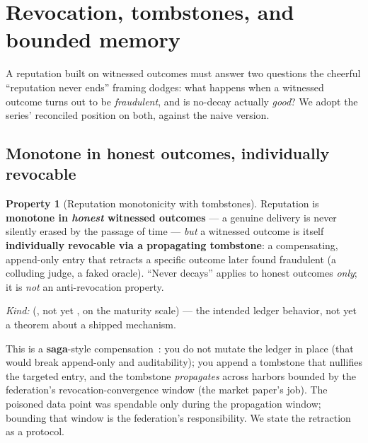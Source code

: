 \documentclass[11pt,a4paper]{article}
\theoremstyle{definition}
\newtheorem{property}{Property}[section]
\newcounter{protocol}[section]
\begin{document}
\section{Revocation, tombstones, and bounded memory}\label{sec:revoke}

\ifdefined\pdswisslandmarkplate
\begin{figure}[p]
  \centering
\end{figure}
\fi

A reputation built on witnessed outcomes must answer two questions the cheerful
``reputation never ends'' framing dodges: what happens when a witnessed outcome
turns out to be \emph{fraudulent}, and is no-decay actually \emph{good}? We adopt
the series' reconciled position on both, against the naive version.

\subsection{Monotone in honest outcomes, individually revocable}

\begin{property}[Reputation monotonicity with tombstones]\label{prop:tombstone}
\setlength{\parskip}{4pt plus 1pt}
Reputation is \textbf{monotone in \emph{honest} witnessed outcomes} --- a genuine
delivery is never silently erased by the passage of time --- \emph{but} a witnessed
outcome is itself \textbf{individually revocable via a propagating tombstone}: a
compensating, append-only entry that retracts a specific outcome later found
fraudulent (a colluding judge, a faked oracle). ``Never decays'' applies to honest
outcomes \emph{only}; it is \emph{not} an anti-revocation property. 

\emph{Kind:}
\DesignInvariantKind{} (\DESIGNED{}, not yet \BUILT{}, on the maturity scale) --- the
intended ledger behavior, not yet a theorem about a shipped mechanism.
\end{property}

\noindent This is a \textbf{saga}-style compensation~: you do
not mutate the ledger in place (that would break append-only and auditability);
you append a tombstone that nullifies the targeted entry, and the tombstone
\emph{propagates} across harbors bounded by the federation's revocation-convergence
window (the market paper's job). The poisoned data point was spendable only during
the propagation window; bounding that window is the federation's responsibility. We
state the retraction as a protocol.
\end{document}
